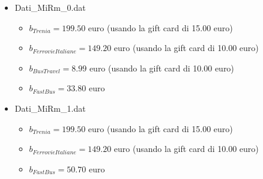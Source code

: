 \documentclass[main.tex]{subfiles}
\begin{document}
\begin{itemize}
\begin{itemize}
        \item Dati\_MiRm\_0.dat
        \begin{itemize}
            \item $b_{Trenia} = 199.50$ euro (usando la gift card di 15.00 euro)
            \item $b_{FerrovieItaliane} = 149.20$ euro (usando la gift card di 10.00 euro)
            \item $b_{BusTravel} =  8.99$ euro (usando la gift card di 10.00 euro)
            \item $b_{FastBus} = 33.80$ euro
        \end{itemize}
        \item Dati\_MiRm\_1.dat
        \begin{itemize}
            \item $b_{Trenia} = 199.50$ euro (usando la gift card di 15.00 euro)
            \item $b_{FerrovieItaliane} = 149.20$ euro (usando la gift card di 10.00 euro)
            \item $b_{FastBus} = 50.70$ euro
        \end{itemize}
    \end{itemize}
\end{itemize}
\end{document}
